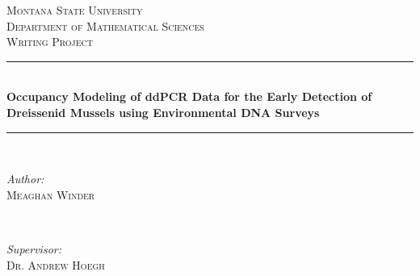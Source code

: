 \documentclass[12pt]{article}\usepackage[]{graphicx}\usepackage[]{color}
\begin{document}
\begin{titlepage}

\newcommand{\HRule}{\rule{\linewidth}{0.5mm}} %

\center %
 

\textsc{\LARGE Montana State University}\\[0.5cm] %
\textsc{\Large Department of Mathematical Sciences}\\[0.5cm] %
\textsc{\large Writing Project}\\[.75cm] %


\HRule \\[0.4cm]
{ \LARGE \bfseries Occupancy Modeling of ddPCR Data for the Early Detection of Dreissenid Mussels using Environmental DNA Surveys}\\[0.4cm] %
\HRule \\[1.5cm]
 

\begin{minipage}{0.4\textwidth}
\begin{flushleft} 
\large
\emph{Author:} \\
\textsc{Meaghan Winder} \\
\end{flushleft}
\end{minipage}
~
\begin{minipage}{0.4\textwidth}
\begin{flushright} 
\large
\emph{Supervisor:} \\
\textsc{Dr. Andrew Hoegh} 
\end{flushright}
\end{minipage}\\[1.5cm]


\end{titlepage}
\end{document}

